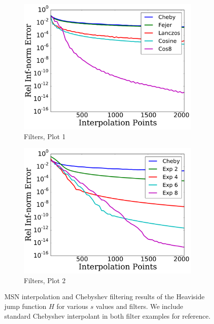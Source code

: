\begin{figure}[p]
    \begin{subfigure}{0.45\textwidth}
    \includegraphics[width=\textwidth]{plots/cheby_interp_filter_rough_heaviside.pdf}
    \caption{Filters, Plot 1}
    \end{subfigure}
    \begin{subfigure}{0.45\textwidth}
    \includegraphics[width=\textwidth]{plots/cheby_interp_filter_2_rough_heaviside.pdf}
    \caption{Filters, Plot 2}
    \end{subfigure}
\caption[Rough Interpolation Comparison: Heaviside Jump Function]{
MSN interpolation and Chebyshev filtering results of the Heaviside jump
function $H$ for various $s$ values and filters.
We include standard Chebyshev interpolant in both filter examples for reference.
}
\label{fig:rough_comparison_heaviside}
\end{figure}



